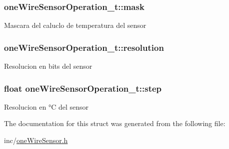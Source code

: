 \subsubsection[{\texorpdfstring{mask}{mask}}]{ one\+Wire\+Sensor\+Operation\+\_\+t\+::mask}\hypertarget{structoneWireSensorOperation__t_ad949fa75df30e68b26cb13d1954f926f}{}\label{structoneWireSensorOperation__t_ad949fa75df30e68b26cb13d1954f926f}
Mascara del caluclo de temperatura del sensor 
\subsubsection[{\texorpdfstring{resolution}{resolution}}]{ one\+Wire\+Sensor\+Operation\+\_\+t\+::resolution}\hypertarget{structoneWireSensorOperation__t_abd4196a82952b4f27576d2132e332311}{}\label{structoneWireSensorOperation__t_abd4196a82952b4f27576d2132e332311}
Resolucion en bits del sensor 
\subsubsection[{\texorpdfstring{step}{step}}]{\setlength{\rightskip}{0pt plus 5cm}float one\+Wire\+Sensor\+Operation\+\_\+t\+::step}\hypertarget{structoneWireSensorOperation__t_ad0fc875806a44bf0290d18d7501f00dc}{}\label{structoneWireSensorOperation__t_ad0fc875806a44bf0290d18d7501f00dc}
Resolucion en °C del sensor 

The documentation for this struct was generated from the following file\+:\begin{DoxyCompactItemize}
\item 
inc/\hyperlink{oneWireSensor_8h}{one\+Wire\+Sensor.\+h}\end{DoxyCompactItemize}
